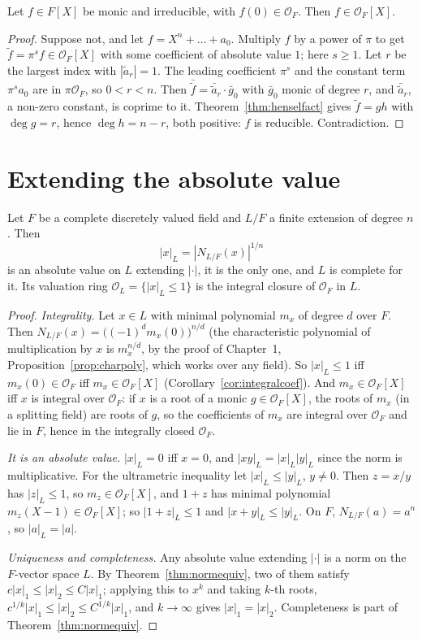 \begin{corollary}\label{cor:integralcoef}
Let $f\in F[X]$ be monic and irreducible, with $f(0)\in\mathcal O_F$. Then $f\in\mathcal O_F[X]$.
\end{corollary}
\begin{proof}
Suppose not, and let $f=X^n+\dots+a_0$. Multiply $f$ by a power of $\pi$ to get $\tilde f=\pi^sf\in\mathcal O_F[X]$ with some
coefficient of absolute value $1$; here $s\ge1$. Let $r$ be the largest index with $|\tilde a_r|=1$. The leading coefficient
$\pi^s$ and the constant term $\pi^sa_0$ are in $\pi\mathcal O_F$, so $0<r<n$. Then $\bar{\tilde f}=\bar{\tilde a}_r\cdot\bar g_0$
with $\bar g_0$ monic of degree $r$, and $\bar{\tilde a}_r$, a non-zero constant, is coprime to it. Theorem~\ref{thm:henselfact}
gives $\tilde f=gh$ with $\deg g=r$, hence $\deg h=n-r$, both positive: $f$ is reducible. Contradiction.
\end{proof}

\section{Extending the absolute value}

\begin{theorem}\label{thm:extabs}
Let $F$ be a complete discretely valued field and $L/F$ a finite extension of degree $n$. Then
\[
|x|_L=|N_{L/F}(x)|^{1/n}
\]
is an absolute value on $L$ extending $|\cdot|$, it is the only one, and $L$ is complete for it. Its valuation ring $\mathcal
O_L=\{|x|_L\le1\}$ is the integral closure of $\mathcal O_F$ in $L$.
\end{theorem}
\begin{proof}
\emph{Integrality.} Let $x\in L$ with minimal polynomial $m_x$ of degree $d$ over $F$. Then $N_{L/F}(x)=\bigl((-1)^dm_x(0)\bigr)^{n/d}$
(the characteristic polynomial of multiplication by $x$ is $m_x^{n/d}$, by the proof of Chapter~1, Proposition~\ref{prop:charpoly}, which works over any field). So $|x|_L\le1$
iff $m_x(0)\in\mathcal O_F$ iff $m_x\in\mathcal O_F[X]$ (Corollary~\ref{cor:integralcoef}). And $m_x\in\mathcal O_F[X]$ iff $x$
is integral over $\mathcal O_F$: if $x$ is a root of a monic $g\in\mathcal O_F[X]$, the roots of $m_x$ (in a splitting field)
are roots of $g$, so the coefficients of $m_x$ are integral over $\mathcal O_F$ and lie in $F$, hence in the integrally closed
$\mathcal O_F$.

\emph{It is an absolute value.} $|x|_L=0$ iff $x=0$, and $|xy|_L=|x|_L|y|_L$ since the norm is multiplicative. For the
ultrametric inequality let $|x|_L\le|y|_L$, $y\ne0$. Then $z=x/y$ has $|z|_L\le1$, so $m_z\in\mathcal O_F[X]$, and $1+z$ has
minimal polynomial $m_z(X-1)\in\mathcal O_F[X]$; so $|1+z|_L\le1$ and $|x+y|_L\le|y|_L$. On $F$, $N_{L/F}(a)=a^n$, so $|a|_L=|a|$.

\emph{Uniqueness and completeness.} Any absolute value extending $|\cdot|$ is a norm on the $F$-vector space $L$. By
Theorem~\ref{thm:normequiv}, two of them satisfy $c|x|_1\le|x|_2\le C|x|_1$; applying this to $x^k$ and taking $k$-th roots,
$c^{1/k}|x|_1\le|x|_2\le C^{1/k}|x|_1$, and $k\to\infty$ gives $|x|_1=|x|_2$. Completeness is part of
Theorem~\ref{thm:normequiv}.
\end{proof}

